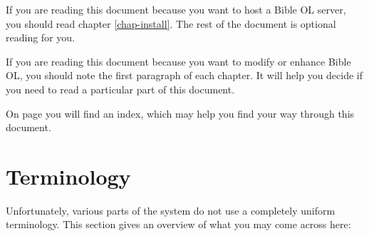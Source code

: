 \documentclass[11pt,oneside,a4paper]{memoir}
\begin{document}
If you are reading this document because you want to host a Bible OL server, you should read chapter
\ref{chap-install}. The rest of the document is optional reading for you.

If you are reading this document because you want to modify or enhance Bible OL, you should note
the first paragraph of each chapter. It will help you decide if you need to read a
particular part of this document.

On page \pageref{sec-index} you will find an index, which may help you find your way through this document.


\section{Terminology}\label{sec-terminology}

Unfortunately, various parts of the system do not use a completely uniform terminology. This section
gives an overview of what you may come across here:
\end{document}
